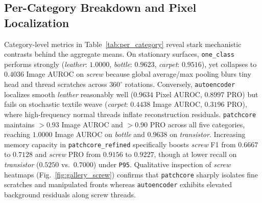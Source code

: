 \documentclass[conference]{IEEEtran}
\begin{document}
\begin{table}[t]
\centering
\caption{Mean Benchmark Performance and Resource Footprint Across Five MVTec AD Categories (Val \texttt{P95} Threshold)}
\label{tab:main_comparison}
\footnotesize
\setlength{\tabcolsep}{4.0pt}
\end{table}

\subsection{Per-Category Breakdown and Pixel Localization}
Category-level metrics in Table~\ref{tab:per_category} reveal stark mechanistic contrasts behind the aggregate means. On stationary surfaces, \texttt{one\_class} performs strongly (\textit{leather}: $1.0000$, \textit{bottle}: $0.9623$, \textit{carpet}: $0.9516$), yet collapses to $0.4036$ Image AUROC on \textit{screw} because global average/max pooling blurs tiny head and thread scratches across $360^\circ$ rotations. Conversely, \texttt{autoencoder} localizes smooth \textit{leather} reasonably well ($0.9634$ Pixel AUROC, $0.8997$ PRO) but fails on stochastic textile weave (\textit{carpet}: $0.4438$ Image AUROC, $0.3196$ PRO), where high-frequency normal threads inflate reconstruction residuals. \texttt{patchcore} maintains $>0.93$ Image AUROC and $>0.90$ PRO across all five categories, reaching $1.0000$ Image AUROC on \textit{bottle} and $0.9638$ on \textit{transistor}. Increasing memory capacity in \texttt{patchcore\_refined} specifically boosts \textit{screw} F1 from $0.6667$ to $0.7128$ and \textit{screw} PRO from $0.9156$ to $0.9227$, though at lower recall on \textit{transistor} ($0.5250$ vs.\ $0.7000$) under \texttt{P95}. Qualitative inspection of \textit{screw} heatmaps (Fig.~\ref{fig:gallery_screw}) confirms that \texttt{patchcore} sharply isolates fine scratches and manipulated fronts whereas \texttt{autoencoder} exhibits elevated background residuals along screw threads.
\end{document}
